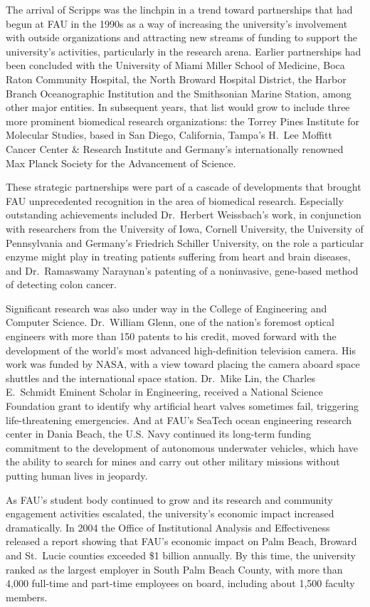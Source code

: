 \documentclass[phd, 12pt, print]{fauthesis}
\begin{document}
The arrival of Scripps was the linchpin in a trend toward partnerships that had begun at FAU in the 1990s as a way of increasing the university's involvement with outside organizations and attracting new streams of funding to support the university's activities, particularly in the research arena.  Earlier partnerships had been concluded with the University of Miami Miller School of Medicine, Boca Raton Community Hospital, the North Broward Hospital District, the Harbor Branch Oceanographic Institution and the Smithsonian Marine Station, among other major entities.  In subsequent years, that list would grow to include three more prominent biomedical research organizations: the Torrey Pines Institute for Molecular Studies, based in San Diego, California, Tampa's H.\ Lee Moffitt Cancer Center \& Research Institute and Germany's internationally renowned Max Planck Society for the Advancement of Science.

These strategic partnerships were part of a cascade of developments that brought FAU unprecedented recognition in the area of biomedical research.  Especially outstanding achievements included Dr.\ Herbert Weissbach's work, in conjunction with researchers from the University of Iowa, Cornell University, the University of Pennsylvania and Germany's Friedrich Schiller University, on the role a particular enzyme might play in treating patients suffering from heart and brain diseases, and Dr.\ Ramaswamy Naraynan's patenting of a noninvasive, gene-based method of detecting colon cancer.

Significant research was also under way in the College of Engineering and Computer Science. Dr.\ William Glenn, one of the nation's foremost optical engineers with more than 150 patents to his credit, moved forward with the development of the world's most advanced high-definition television camera.  His work was funded by NASA, with a view toward placing the camera aboard space shuttles and the international space station.  Dr.\ Mike Lin, the Charles E.\ Schmidt Eminent Scholar in Engineering, received a National Science Foundation grant to identify why artificial heart valves sometimes fail, triggering life-threatening emergencies.  And at FAU's SeaTech ocean engineering research center in Dania Beach, the U.S. Navy continued its long-term funding commitment to the development of autonomous underwater vehicles, which have the ability to search for mines and carry out other military missions without putting human lives in jeopardy.

As FAU's student body continued to grow and its research and community engagement activities escalated, the university's economic impact increased dramatically.  In 2004 the Office of Institutional Analysis and Effectiveness released a report showing that FAU's economic impact on Palm Beach, Broward and St.\ Lucie counties exceeded \$1 billion annually.  By this time, the university ranked as the largest employer in South Palm Beach County, with more than 4,000 full-time and part-time employees on board, including about 1,500 faculty members.
\end{document}
